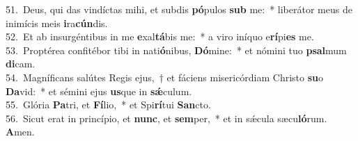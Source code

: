 {51.~}Deus, qui das vindíctas mihi, et subdis \textbf{pó}pulos \textbf{sub} me:~* liberátor meus de inimícis meis \textbf{i}ra\textbf{cún}dis.\\
{52.~}Et ab insurgéntibus in me \textbf{e}xal\textbf{tá}bis me:~* a viro iníquo e\textbf{rí}pi\textbf{es} me.\\
{53.~}Proptérea confitébor tibi in nati\textbf{ó}nibus, \textbf{Dó}mine:~* et nómini tuo \textbf{psal}mum \textbf{di}cam.\\
{54.~}Magníficans salútes Regis ejus,~† et fáciens misericórdiam Christo \textbf{su}o \textbf{Da}vid:~* et sémini ejus \textbf{us}que in \textbf{sǽ}culum.\\
{55.~}Glória \textbf{Pa}tri, et \textbf{Fí}lio,~* et Spi\textbf{rí}tui \textbf{San}cto.\\
{56.~}Sicut erat in princípio, et \textbf{nunc}, et \textbf{sem}per,~* et in sǽcula sæcu\textbf{ló}rum. \textbf{A}men.\\
